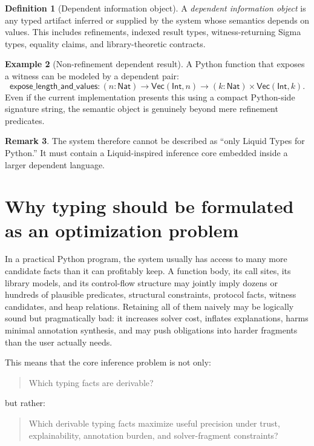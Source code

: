 \documentclass[11pt]{article}
\theoremstyle{definition}
\newtheorem{definition}{Definition}[section]
\newtheorem{example}[definition]{Example}
\newtheorem{remark}[definition]{Remark}
\theoremstyle{plain}
\begin{document}
\begin{definition}[Dependent information object]
A \emph{dependent information object} is any typed artifact inferred or supplied
by the system whose semantics depends on values. This includes refinements,
indexed result types, witness-returning Sigma types, equality claims, and
library-theoretic contracts.
\end{definition}

\begin{example}[Non-refinement dependent result]
A Python function that exposes a witness can be modeled by a dependent pair:
\[
\mathsf{expose\_length\_and\_values} :
(n : \mathsf{Nat}) \to \mathsf{Vec}(\mathsf{Int}, n)
\to (k : \mathsf{Nat}) \times \mathsf{Vec}(\mathsf{Int}, k).
\]
Even if the current implementation presents this using a compact Python-side
signature string, the semantic object is genuinely beyond mere refinement
predicates.
\end{example}

\begin{remark}
The system therefore cannot be described as ``only Liquid Types for Python.'' It
must contain a Liquid-inspired inference core embedded inside a larger dependent
language.
\end{remark}



\section{Why typing should be formulated as an optimization problem}

In a practical Python program, the system usually has access to many more
candidate facts than it can profitably keep. A function body, its call sites,
its library models, and its control-flow structure may jointly imply dozens or
hundreds of plausible predicates, structural constraints, protocol facts,
witness candidates, and heap relations. Retaining all of them naively may be
logically sound but pragmatically bad: it increases solver cost, inflates
explanations, harms minimal annotation synthesis, and may push obligations into
harder fragments than the user actually needs.

This means that the core inference problem is not only:
\begin{quote}
Which typing facts are derivable?
\end{quote}
but rather:
\begin{quote}
Which derivable typing facts maximize useful precision under trust, explainability,
annotation burden, and solver-fragment constraints?
\end{quote}
\end{document}
